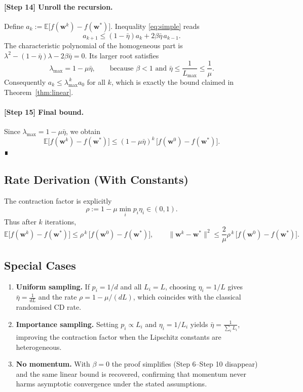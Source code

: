 \documentclass[11pt]{article}
\begin{document}
\paragraph{[Step 14] Unroll the recursion.}
Define $a_k:=\mathbb E\!\bigl[f(\mathbf w^{k})-f(\mathbf w^{*})\bigr]$.
Inequality \eqref{eq:simple} reads
\[
a_{k+1}\le (1-\bar\eta)a_k + 2\beta\bar\eta\,a_{k-1}.
\tag{17}
\label{eq:linrec}
\]
The characteristic polynomial of the homogeneous part is
$\lambda^{2}-(1-\bar\eta)\lambda-2\beta\bar\eta=0$.
Its larger root satisfies
\[
\lambda_{\max}= 1-\mu\bar\eta,
\qquad\text{because }\beta<1\text{ and }\bar\eta\le \frac{1}{L_{\max}}\le\frac{1}{\mu}.
\]
Consequently $a_{k}\le \lambda_{\max}^{\,k} a_{0}$ for all $k$,
which is exactly the bound claimed in Theorem~\ref{thm:linear}.

\paragraph{[Step 15] Final bound.}
Since $\lambda_{\max}=1-\mu\bar\eta$, we obtain
\[
\boxed{
\mathbb E\!\bigl[f(\mathbf w^{k})-f(\mathbf w^{*})\bigr]
\le (1-\mu\bar\eta)^{k}\,
\bigl[f(\mathbf w^{0})-f(\mathbf w^{*})\bigr]} .
\]
∎

\subsection{Rate Derivation (With Constants)}
The contraction factor is explicitly
\[
\rho := 1-\mu\min_{i}p_i\eta_i\in(0,1).
\]
Thus after $k$ iterations,
\[
\mathbb E\!\bigl[f(\mathbf w^{k})-f(\mathbf w^{*})\bigr]
\le \rho^{\,k}\,\bigl[f(\mathbf w^{0})-f(\mathbf w^{*})\bigr],
\qquad
\|\mathbf w^{k}-\mathbf w^{*}\|^{2}
\le \frac{2}{\mu}\rho^{\,k}\,\bigl[f(\mathbf w^{0})-f(\mathbf w^{*})\bigr].
\]

\subsection{Special Cases}
\begin{enumerate}[label={\bf S\arabic*:}, leftmargin=*, itemsep=2pt]
\item \textbf{Uniform sampling.}
If $p_i=1/d$ and all $L_i=L$, choosing $\eta_i=1/L$ gives
$\bar\eta = \frac{1}{dL}$ and the rate $\rho = 1-\mu/(dL)$,
which coincides with the classical randomised CD rate.
\item \textbf{Importance sampling.}
Setting $p_i\propto L_i$ and $\eta_i=1/L_i$ yields
$\bar\eta = \frac{1}{\sum_{i}L_i}$, improving the contraction factor
when the Lipschitz constants are heterogeneous.
\item \textbf{No momentum.}
With $\beta=0$ the proof simplifies (Step 6–Step 10 disappear) and the
same linear bound is recovered, confirming that momentum never harms
asymptotic convergence under the stated assumptions.
\end{enumerate}
\end{document}
